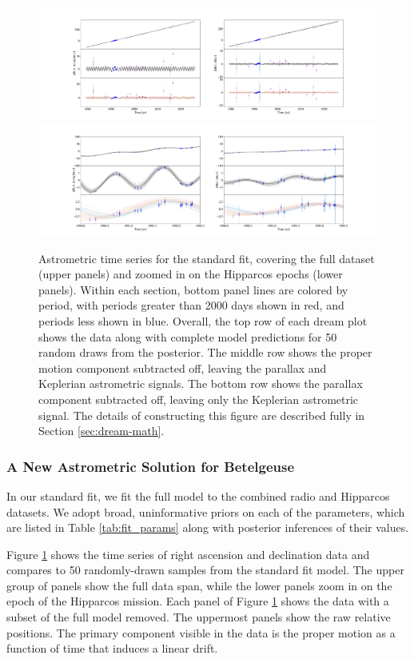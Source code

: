 \documentclass[twocolumn]{aastex631}
\begin{document}
\begin{figure}
    \centering
    \includegraphics[width=\linewidth, trim={8cm 0cm 8cm 1cm}]{figures/dreamplot.pdf}
    \includegraphics[width=\linewidth, trim={8cm 0cm 8cm 1cm}]{figures/dreamplot_zoomin.pdf}
    \caption{ Astrometric time series for the standard fit, covering the full dataset (upper panels) and  zoomed in on the Hipparcos epochs (lower panels). Within each section, bottom panel lines are colored by period, with periods greater than 2000 days shown in red, and periods less shown in blue. Overall, the top row of each dream plot shows the data along with complete model predictions for 50 random draws from the posterior. The middle row shows the proper motion component subtracted off, leaving the parallax and Keplerian astrometric signals. The bottom row shows the parallax component subtracted off, leaving only the Keplerian astrometric signal. The details of constructing this figure are described fully in Section \ref{sec:dream-math}.}
    \label{fig:dreamplot}
\end{figure}


\subsubsection{A New Astrometric Solution for Betelgeuse}

In our standard fit, we fit the full model to the combined radio and Hipparcos datasets. We adopt broad, uninformative priors on each of the parameters, which are listed in Table \ref{tab:fit_params} along with posterior inferences of their values. 

Figure \ref{fig:dreamplot} shows the time series of right ascension and declination data and compares to 50 randomly-drawn samples from the standard fit model. The upper group of panels show the full data span, while the lower panels zoom in on the epoch of the Hipparcos mission.  Each panel of Figure \ref{fig:dreamplot} shows the data with a subset of the full model removed. The uppermost panels show the raw relative positions. The primary component visible in the data is the proper motion as a function of time that induces a linear drift. 
\end{document}
